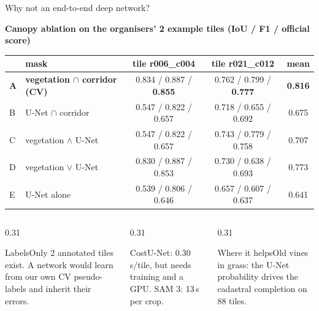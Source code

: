 \begin{frame}{Why not an end-to-end deep network?}\relax
  {\scriptsize\bfseries\color{sxNight} Canopy ablation on the organisers' 2 example tiles (IoU / F1 / official score)\par}
  \vspace{2mm}
  {\scriptsize
  \begin{tabular}{@{}l l c c c@{}}
    \toprule
    & \textbf{mask} & \textbf{tile r006\_c004} & \textbf{tile r021\_c012} & \textbf{mean}\\
    \midrule
    \textcolor{sxIndigo}{\textbf{A}} & \textcolor{sxIndigo}{\textbf{vegetation $\cap$ corridor (CV)}} & 0.834 / 0.887 / \textbf{0.855} & 0.762 / 0.799 / \textbf{0.777} & \textcolor{sxIndigo}{\textbf{0.816}}\\
    B & U-Net $\cap$ corridor           & 0.547 / 0.822 / 0.657 & 0.718 / 0.655 / 0.692 & 0.675\\
    C & vegetation $\wedge$ U-Net       & 0.547 / 0.822 / 0.657 & 0.743 / 0.779 / 0.758 & 0.707\\
    D & vegetation $\vee$ U-Net         & 0.830 / 0.887 / 0.853 & 0.730 / 0.638 / 0.693 & 0.773\\
    E & U-Net alone                     & 0.539 / 0.806 / 0.646 & 0.657 / 0.607 / 0.637 & 0.641\\
    \bottomrule
  \end{tabular}\par}
  \vspace{4mm}
  \begin{columns}[T]
    \begin{column}{0.31\textwidth}\begin{sxcard}{Labels}Only 2 annotated tiles exist. A network would learn from our own CV pseudo-labels and inherit their errors.\end{sxcard}\end{column}
    \begin{column}{0.31\textwidth}\begin{sxcard}{Cost}U-Net: 0.30\,s/tile, but needs training and a GPU. SAM 3: 13\,s per crop.\end{sxcard}\end{column}
    \begin{column}{0.31\textwidth}\begin{sxcard}{Where it helps}Old vines in grass: the U-Net probability drives the cadastral completion on 88 tiles.\end{sxcard}\end{column}
  \end{columns}
\end{frame}

